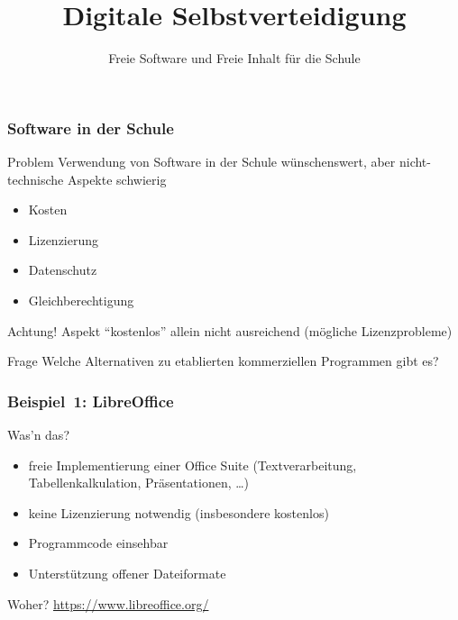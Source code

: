 \documentclass{beamer}
\begin{document}
\title{Digitale Selbstverteidigung}
\subtitle{Freie Software und Freie Inhalt für die Schule}

\maketitle

\begin{frame}
  \frametitle{Software in der Schule}

  \onslide<+->

  \begin{block}{Problem}
    Verwendung von Software in der Schule wünschenswert, aber
    nicht-technische Aspekte schwierig
    \begin{itemize}
    \item Kosten
    \item Lizenzierung
    \item Datenschutz
    \item Gleichberechtigung
    \end{itemize}
  \end{block}

  \onslide<+->

  \begin{block}{Achtung!}
    Aspekt \enquote{kostenlos} allein nicht ausreichend (mögliche
    Lizenzprobleme)
  \end{block}

  \onslide<+->

  \begin{block}{Frage}
    Welche Alternativen zu etablierten kommerziellen Programmen gibt es?
  \end{block}

\end{frame}

\begin{frame}
  \frametitle{Beispiel~1: LibreOffice}

  \onslide<+->

  \begin{block}{Was'n das?}
    \begin{itemize}
    \item freie Implementierung einer Office Suite (Textverarbeitung,
      Tabellenkalkulation, Präsentationen, \dots)
    \item keine Lizenzierung notwendig (insbesondere kostenlos)
    \item Programmcode einsehbar
    \item Unterstützung offener Dateiformate
    \end{itemize}
  \end{block}

  \onslide<+->

  \begin{block}{Woher?}
    \url{https://www.libreoffice.org/}
  \end{block}


\end{frame}
\end{document}
